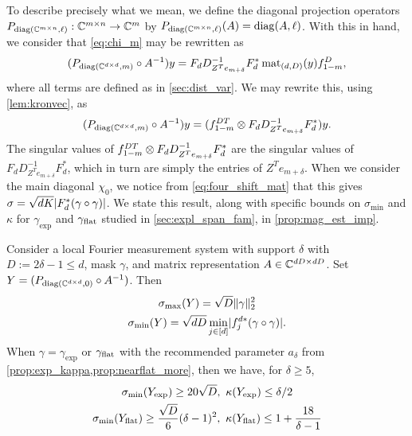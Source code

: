 To describe precisely what we mean, we define the diagonal projection operators $P_{\operatorname{diag}(\mathbb{C}^{m \times n}, \ell)} : \mathbb{C}^{m \times n} \to \mathbb{C}^m$ by $P_{\operatorname{diag}(\mathbb{C}^{m \times n}, \ell)}(A) = \operatorname{diag}(A, \ell)$.  With this in hand, we consider that \eqref{eq:chi_m} may be rewritten as \begin{equation} (P_{\operatorname{diag}(\mathbb{C}^{d \times d}, m)} \circ A^{-1}) y = F_d D^{-1}_{Z^T e_{m + \delta}} F_d^* \operatorname{mat}_{(d, D)}(y) f_{1 - m}^D, \label{eq:chi_mop} \end{equation} where all terms are defined as in \cref{sec:dist_var}.  We may rewrite this, using \cref{lem:kronvec}, as \[(P_{\operatorname{diag}(\mathbb{C}^{d \times d}, m)} \circ A^{-1}) y = (f_{1 - m}^{D T} \otimes F_d D^{-1}_{Z^T e_{m + \delta}} F_d^*) y.\]  The singular values of $f_{1 - m}^{D T} \otimes F_d D^{-1}_{Z^T e_{m + \delta}} F_d^*$ are the singular values of $F_d D^{-1}_{Z^T e_{m + \delta}} F_d^*$, which in turn are simply the entries of $Z^T e_{m + \delta}$.  When we consider the main diagonal $\chi_0$, we notice from \eqref{eq:four_shift_mat} that this gives $\sigma = \sqrt{d K} \lvert F_d^* (\gamma \circ \gamma)\rvert$.  We state this result, along with specific bounds on $\sigma_{\min}$ and $\kappa$ for $\gamma_{\exp}$ and $\gamma_{\rm flat}$ studied in \cref{sec:expl_span_fam}, in \cref{prop:mag_est_imp}.

\begin{proposition}
  Consider a local Fourier measurement system with support $\delta$ with $D := 2 \delta - 1 \le d$, mask $\gamma$, and matrix representation $A \in \mathbb{C}^{d D \times d D}$.  Set $Y = (P_{\operatorname{diag}(\mathbb{C}^{d \times d}, 0)} \circ A^{-1})$.  Then 
  \begin{equation}
    \begin{gathered}
      \sigma_{\max}(Y) = \sqrt{D} \lVert\gamma\rVert_2^2 \\
      \sigma_{\min}(Y) = \sqrt{d D} \min_{j \in [d]} \lvert f_j^{d*} (\gamma \circ \gamma)\rvert.
    \end{gathered}
    \label{eq:magimp}
  \end{equation}
  When $\gamma = \gamma_{\exp}$ or $\gamma_{\rm flat}$ with the recommended parameter $a_\delta$ from \cref{prop:exp_kappa,prop:nearflat_more}, then we have, for $\delta \ge 5$,
  \begin{equation}
    \begin{gathered}
      \sigma_{\min}(Y_{\exp}) \ge 20 \sqrt{D}, \ \kappa(Y_{\exp}) \le \delta / 2 \\
      \sigma_{\min}(Y_{\rm flat})  \ge \frac{\sqrt{D}}{6} (\delta - 1)^2, \ \kappa(Y_{\rm flat})  \le 1 + \frac{18}{\delta - 1}
    \end{gathered}
    \label{eq:mask_magimp}
  \end{equation}
  \label{prop:mag_est_imp}
\end{proposition}

